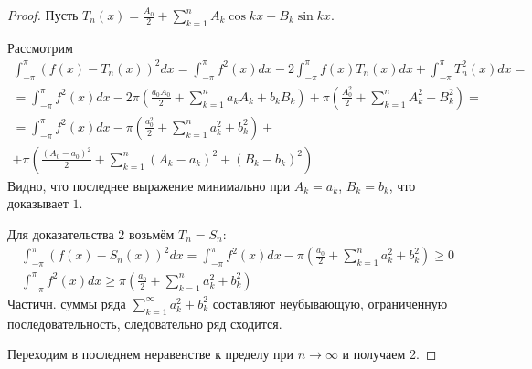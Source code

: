 \documentclass{article}
\theoremstyle{definition}
\numberwithin{theorem}{section}
\numberwithin{lemma}{section}
\numberwithin{definition}{section}
\numberwithin{corollary}{section}
\numberwithin{equation}{section}
\begin{document}
\begin{proof}
  Пусть $T_n(x)=\frac{A_0}{2}+\sum_{k=1}^{n}A_k\cos kx + B_k\sin kx$.

  Рассмотрим
  \begin{gather*}
    \int_{-\pi}^{\pi}(f(x)-T_n(x))^{2}dx=\int_{-\pi}^{\pi}f^{2}(x)dx - 2\int_{-\pi}^{\pi}f(x)T_n(x)dx+\int_{-\pi}^{\pi}T_n^{2}(x)dx = \\ 
    = \int_{-\pi}^{\pi} f^{2}(x)dx -2\pi (\frac{a_0A_0}{2}+\sum_{k=1}^{n}a_kA_k+b_kB_k)+\pi(\frac{A_0^{2}}{2}+\sum_{k=1}^{n}A_k^{2}+B_k^{2})= \\ 
    = \int_{-\pi}^{\pi}f^{2}(x)dx-\pi\left(\frac{a_0^{2}}{2}+\sum_{k=1}^{n}a_k^{2}+b_k^{2}\right) +\\
    +\pi\left(\frac{(A_0-a_0)^{2}}{2}+\sum_{k=1}^{n}(A_k-a_k)^{2}+(B_k-b_k)^{2}\right)
  \end{gather*}
  Видно, что последнее выражение минимально при $A_k=a_k$, $B_k=b_k$,
  что доказывает $1$.

  Для доказательства $2$ возьмём $T_n=S_n$:
  \begin{gather*}
    \int_{-\pi}^{\pi}(f(x)-S_n(x))^{2}dx=\int_{-\pi}^{\pi}f^{2}(x)dx-\pi\left(\frac{a_0}{2}+\sum_{k=1}^{n}a_k^{2}+b_k^{2}\right) \ge 0\\
    \int_{-\pi}^{\pi}f^{2}(x)dx \ge \pi\left(\frac{a_0}{2}+\sum_{k=1}^{n}a_k^{2}+b_k^{2}\right)
  \end{gather*}
  Частичн. суммы ряда $\sum_{k=1}^{\infty}a_k^{2}+b_k^{2}$ составляют неубывающую,
  ограниченную последовательность, следовательно ряд сходится.

  Переходим в последнем неравенстве к пределу при $n\to\infty$ и получаем 2.
\end{proof}

\end{document}
